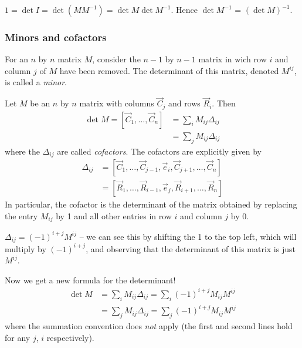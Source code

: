 \documentclass{../../template/note}
\begin{document}
    \begin{corollary}
        \(1 = \det I = \det (MM^{-1}) = \det M \det M^{-1}\). Hence \(\det M^{-1}\) = \((\det M)^{-1}\).
    \end{corollary}
    
    \subsubsection{Minors and cofactors}

    \begin{definition}
        For an \(n\) by \(n\) matrix \(M\), consider the \(n-1\) by \(n-1\) matrix in wich row \(i\) and column \(j\) of \(M\) have been removed. The determinant of this matrix, denoted \(M^{ij}\), is called a \emph{minor}.
    \end{definition}
    
    \begin{definition}
        Let \(M\) be an \(n\) by \(n\) matrix with columns \(\vec C_j\) and rows \(\vec R_i\). Then
        \begin{align*}
            \det M = [\vec C_1, \dots, \vec C_n] &= \sum_{i} M_{ij} \Delta_{ij} \\
            &= \sum_j M_{ij} \Delta_{ij}
        \end{align*}
        where the \(\Delta_{ij}\) are called \emph{cofactors}. The cofactors are explicitly given by
        \begin{align*}
            \Delta_{ij} &= [\vec C_1, \dots, \vec C_{j-1}, \vec e_i, \vec C_{j+1}, \dots, \vec C_n] \\
            &= [\vec R_1, \dots, \vec R_{i-1}, \vec e_j, \vec R_{i+1}, \dots, \vec R_n]
        \end{align*}
        In particular, the cofactor is the determinant of the matrix obtained by replacing the entry \(M_{ij}\) by 1 and all other entries in row \(i\) and column \(j\) by 0.
    \end{definition}
    
    \begin{remark}
        \(\Delta_{ij} = (-1)^{i+j}M^{ij}\) -- we can see this by shifting the 1 to the top left, which will multiply by \((-1)^{i+j}\), and observing that the determinant of this matrix is just \(M^{ij}\).
    \end{remark}
    Now we get a new formula for the determinant!
    \begin{align*}
        \det M &= \sum_i M_{ij} \Delta_{ij} = \sum_i (-1)^{i+j} M_{ij} M^{ij} \\
        &= \sum_j M_{ij} \Delta_{ij} = \sum_j (-1)^{i+j} M_{ij} M^{ij}
    \end{align*}
    where the summation convention does \emph{not} apply (the first and second lines hold for any \(j\), \(i\) respectively).
\end{document}
